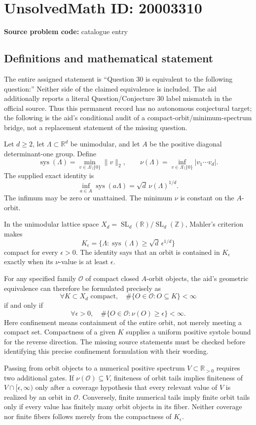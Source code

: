 \documentclass[11pt]{article}
\newcommand{\Z}{\mathbb{Z}}
\newcommand{\R}{\mathbb{R}}
\begin{document}
\section*{UnsolvedMath ID: 20003310}
\textbf{Source problem code:} catalogue entry
\subsection{Definitions and mathematical statement}
The entire assigned statement is ``Question 30 is equivalent to the following question:'' Neither side of the claimed equivalence is included. The aid additionally reports a literal Question/Conjecture 30 label mismatch in the official source. Thus this permanent record has no autonomous conjectural target; the following is the aid's conditional audit of a compact-orbit/minimum-spectrum bridge, not a replacement statement of the missing question.

Let \(d\geq2\), let \(\Lambda\subset\R^d\) be unimodular, and let \(A\) be the positive diagonal determinant-one group. Define
\[
 \operatorname{sys}(\Lambda)=\min_{v\in\Lambda\setminus\{0\}}\|v\|_2,
 \qquad\nu(\Lambda)=\inf_{v\in\Lambda\setminus\{0\}}|v_1\cdots v_d|.
\]
The supplied exact identity is
\[
 \inf_{a\in A}\operatorname{sys}(a\Lambda)
 =\sqrt d\,\nu(\Lambda)^{1/d}.
\]
The infimum may be zero or unattained. The minimum \(\nu\) is constant on the \(A\)-orbit.

In the unimodular lattice space \(X_d=\operatorname{SL}_d(\R)/\operatorname{SL}_d(\Z)\), Mahler's criterion makes
\[
 K_\epsilon=\{\Lambda:\operatorname{sys}(\Lambda)\geq\sqrt d\,\epsilon^{1/d}\}
\]
compact for every \(\epsilon>0\). The identity says that an orbit is contained in \(K_\epsilon\) exactly when its \(\nu\)-value is at least \(\epsilon\).

For any specified family \(\mathscr O\) of compact closed \(A\)-orbit objects, the aid's geometric equivalence can therefore be formulated precisely as
\[
 \forall K\subset X_d\text{ compact},\quad
 \#\{O\in\mathscr O:O\subseteq K\}<\infty
\]
if and only if
\[
 \forall\epsilon>0,\quad
 \#\{O\in\mathscr O:\nu(O)\geq\epsilon\}<\infty.
\]
Here confinement means containment of the entire orbit, not merely meeting a compact set. Compactness of a given \(K\) supplies a uniform positive systole bound for the reverse direction. The missing source statements must be checked before identifying this precise confinement formulation with their wording.

Passing from orbit objects to a numerical positive spectrum \(V\subset\R_{>0}\) requires two additional gates. If \(\nu(\mathscr O)\subseteq V\), finiteness of orbit tails implies finiteness of \(V\cap[\epsilon,\infty)\) only after a coverage hypothesis that every relevant value of \(V\) is realized by an orbit in \(\mathscr O\). Conversely, finite numerical tails imply finite orbit tails only if every value has finitely many orbit objects in its fiber. Neither coverage nor finite fibers follows merely from the compactness of \(K_\epsilon\).
\end{document}
